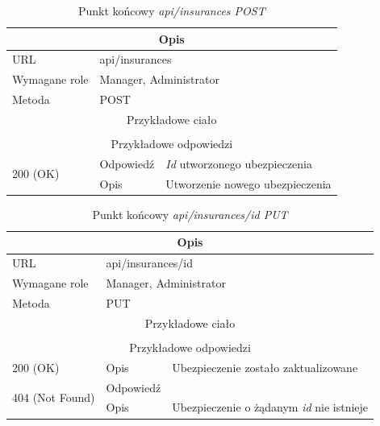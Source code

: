 \documentclass[eng,printmode,openany]{mgr}
\begin{document}
	\begin{table}[H]
		\caption{Punkt końcowy \textit{api/insurances POST}}
		\begin{tabularx}{\textwidth}{|l|l|X|}
			\hline
			\multicolumn{3}{|c|}{Opis}                         						\\ \hline
			URL                       & \multicolumn{2}{l|}{api/insurances} 	    \\ \hline
			Wymagane role             & \multicolumn{2}{l|}{Manager, Administrator} \\ \hline
			Metoda                    & \multicolumn{2}{l|}{POST} 					\\ \hline
			\multicolumn{3}{|c|}{Przykładowe ciało}         						\\ \hline
			\multicolumn{3}{|c|}{} 		        \\ \hline
			\multicolumn{3}{|c|}{ Przykładowe odpowiedzi}                   		                        \\ \hline
			\multirow{2}{*}{200 (OK)} 			& Odpowiedź     &  \textit{Id} utworzonego ubezpieczenia    \\ \cline{2-3} 
			& Opis         	& Utworzenie nowego ubezpieczenia						    \\ \hline
		\end{tabularx}
	\end{table}
	
	\begin{table}[H]
		\caption{Punkt końcowy \textit{api/insurances/id PUT}}
		\begin{tabularx}{\textwidth}{|l|l|X|}
			\hline
			\multicolumn{3}{|c|}{Opis}                         						            \\ \hline
			URL                       & \multicolumn{2}{l|}{api/insurances/id} 	                \\ \hline
			Wymagane role             & \multicolumn{2}{l|}{Manager, Administrator}             \\ \hline	
			Metoda                    & \multicolumn{2}{l|}{PUT} 					            \\ \hline
			\multicolumn{3}{|c|}{Przykładowe ciało}         						            \\ \hline
			\multicolumn{3}{|c|}{} 	\\ \hline
			\multicolumn{3}{|c|}{Przykładowe odpowiedzi}                   		                \\ \hline
			200 (OK)			& Opis         	& Ubezpieczenie zostało zaktualizowane									            \\ \hline
			\multirow{2}{*}{404 (Not Found)} 	& Odpowiedź     &    \\ \cline{2-3} 
			& Opis          & Ubezpieczenie o żądanym \textit{id} nie istnieje  							    \\ \hline
		\end{tabularx}
	\end{table}
	
\end{document}
